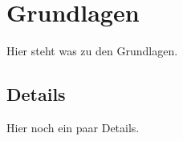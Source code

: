 \section{Grundlagen}
\begin{frame}
Hier steht was zu den Grundlagen.
\end{frame}

\subsection{Details}
\begin{frame}
Hier noch ein paar Details.
\end{frame}